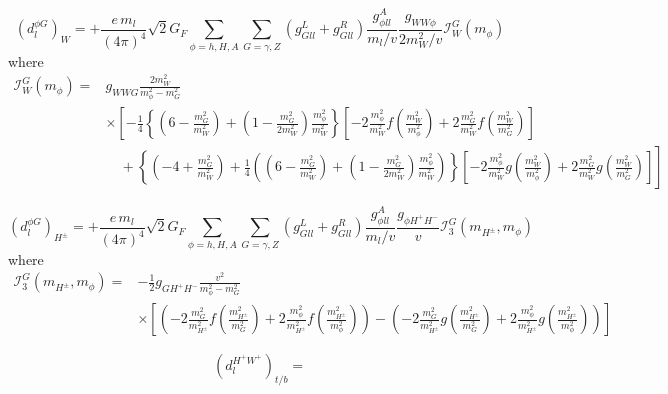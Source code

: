 \begin{equation}\label{eq:BarrZee-phiG-Wloop}
	(d^{\phi G}_{l})_{W} = +\frac{e\,m_{l}}{(4\pi)^{4}}\sqrt{2}G_{F}\sum_{\phi=h,H,A}\sum_{G=\gamma,Z}(g_{Gll}^{L}+g_{Gll}^{R})\frac{g_{\phi ll}^{A}}{m_{l}/v}\frac{g_{WW\phi}}{2m_{W}^{2}/v}\mathcal{I}_{W}^{G}(m_{\phi})
\end{equation}
where
\begin{align}
	\mathcal{I}_{W}^{G}(m_{\phi}) = &g_{WWG}\frac{2m_{W}^{2}}{m_{\phi}^{2}-m_{G}^{2}} \nonumber \\
	& \times \left[-\frac{1}{4}\left\{\left(6-\frac{m_{G}^{2}}{m_{W}^{2}}\right) + \left(1-\frac{m_{G}^{2}}{2m_{W}^{2}}\right)\frac{m_{\phi}^{2}}{m_{W}^{2}}\right\}
	\left[-2\frac{m_{\phi}^{2}}{m_{W}^{2}} f\left(\frac{m_{W}^{2}}{m_{\phi}^{2}}\right) + 2\frac{m_{G}^{2}}{m_{W}^{2}} f\left(\frac{m_{W}^{2}}{m_{G}^{2}}\right)\right]\right. \nonumber \\
	&\left. \quad + \left\{\left(-4+\frac{m_{G}^{2}}{m_{W}^{2}}\right) + \frac{1}{4}\left(\left(6-\frac{m_{G}^{2}}{m_{W}^{2}}\right) + \left(1-\frac{m_{G}^{2}}{2m_{W}^{2}}\right)\frac{m_{\phi}^{2}}{m_{W}^{2}}\right)\right\}
	\left[-2\frac{m_{\phi}^{2}}{m_{W}^{2}} g\left(\frac{m_{W}^{2}}{m_{\phi}^{2}}\right) + 2\frac{m_{G}^{2}}{m_{W}^{2}} g\left(\frac{m_{W}^{2}}{m_{G}^{2}}\right)\right]\right]
\end{align}

\begin{equation}\label{eq:BarrZee-phiG-cHloop}
	(d^{\phi G}_{l})_{H^{\pm}} = +\frac{e\,m_{l}}{(4\pi)^{4}}\sqrt{2}G_{F}\sum_{\phi=h,H,A}\sum_{G=\gamma,Z}(g_{Gll}^{L}+g_{Gll}^{R})\frac{g_{\phi ll}^{A}}{m_{l}/v}\frac{g_{\phi H^{+}H^{-}}}{v}\mathcal{I}_{3}^{G}(m_{H^{\pm}}, m_{\phi})
\end{equation}
where
\begin{align}
	\mathcal{I}_{3}^{G}(m_{H^{\pm}}, m_{\phi}) =& -\frac{1}{2}g_{GH^{+}H^{-}}\frac{v^{2}}{m_{\phi}^{2}-m_{G}^{2}} \nonumber \\
	& \times \left[\left(-2\frac{m_{G}^{2}}{m_{H^{\pm}}^{2}} f\left(\frac{m_{H^{\pm}}^{2}}{m_{G}^{2}}\right) + 2\frac{m_{\phi}^{2}}{m_{H^{\pm}}^{2}} f\left(\frac{m_{H^{\pm}}^{2}}{m_{\phi}^{2}}\right)\right)
	-\left(-2\frac{m_{G}^{2}}{m_{H^{\pm}}^{2}} g\left(\frac{m_{H^{\pm}}^{2}}{m_{G}^{2}}\right) + 2\frac{m_{\phi}^{2}}{m_{H^{\pm}}^{2}} g\left(\frac{m_{H^{\pm}}^{2}}{m_{\phi}^{2}}\right)\right)\right]
\end{align}

\begin{equation}\label{eq:BarrZee-cHW-tbloop}
	(d^{H^{+}W^{+}}_{l})_{t/b} = 
\end{equation}

